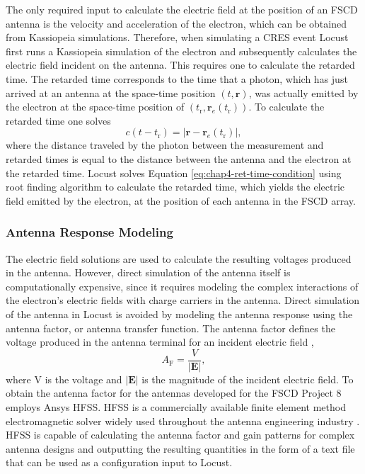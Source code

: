 The only required input to calculate the electric field at the position of an FSCD antenna is the velocity and acceleration of the electron, which can be obtained from Kassiopeia simulations. Therefore, when simulating a CRES event Locust first runs a Kassiopeia simulation of the electron and subsequently calculates the electric field incident on the antenna. This requires one to calculate the retarded time. The retarded time corresponds to the time that a photon, which has just arrived at an antenna at the space-time position $(t,\bm{r})$, was actually emitted by the electron at the space-time position of $(t_\mathrm{r}, \bm{r}_e(t_\mathrm{r}))$. To calculate the retarded time one solves
\begin{equation}
    c(t-t_\mathrm{r}) = |\bm{r}-\bm{r}_e(t_\mathrm{r})|,
    \label{eq:chap4-ret-time-condition}
\end{equation}
where the distance traveled by the photon between the measurement and retarded times is equal to the distance between the antenna and the electron at the retarded time. Locust solves Equation \ref{eq:chap4-ret-time-condition} using root finding algorithm to calculate the retarded time, which yields the electric field emitted by the electron, at the position of each antenna in the FSCD array.

\subsubsection*{Antenna Response Modeling}

The electric field solutions are used to calculate the resulting voltages produced in the antenna. However, direct simulation of the antenna itself is computationally expensive, since it requires modeling the complex interactions of the electron's electric fields with charge carriers in the antenna. Direct simulation of the antenna in Locust is avoided by modeling the antenna response using the antenna factor, or antenna transfer function. The antenna factor defines the voltage produced in the antenna terminal for an incident electric field \cite{balanis2015antenna},
\begin{equation}
    A_\mathrm{F}=\frac{V}{|\bm{E}|},
\end{equation}
where V is the voltage and $|\bm{E}|$ is the magnitude of the incident electric field. To obtain the antenna factor for the antennas developed for the FSCD Project 8 employs Ansys HFSS. HFSS is a commercially available finite element method electromagnetic solver widely used throughout the antenna engineering industry \cite{hfss}. HFSS is capable of calculating the antenna factor and gain patterns for complex antenna designs and outputting the resulting quantities in the form of a text file that can be used as a configuration input to Locust. 

